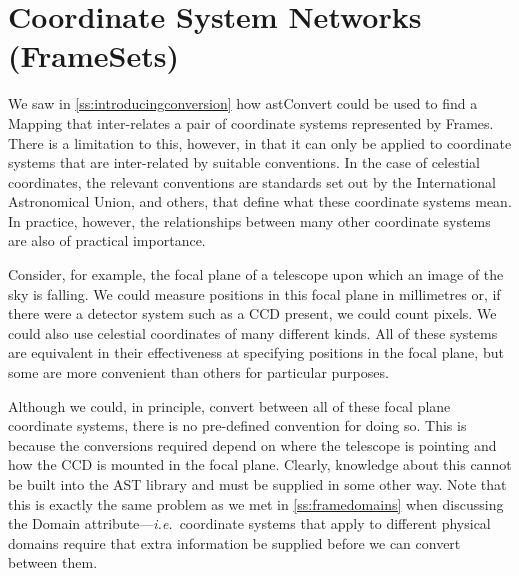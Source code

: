 \documentclass[twoside,11pt]{article}
\newcommand{\htmlref}[2]{#1}
\newcommand{\secref}[1]{\S\ref{#1}}
\renewcommand{\secref}[1]{\ref{#1}}
\begin{document}
%
%

\cleardoublepage
\section{\label{ss:framesets}Coordinate System Networks (FrameSets)}

We saw in \secref{ss:introducingconversion} how \htmlref{astConvert}{astConvert} could be
used to find a \htmlref{Mapping}{Mapping} that inter-relates a pair of coordinate systems
represented by Frames. There is a limitation to this, however, in that
it can only be applied to coordinate systems that are inter-related by
suitable conventions. In the case of celestial coordinates, the
relevant conventions are standards set out by the International
Astronomical Union, and others, that define what these coordinate
systems mean. In practice, however, the relationships between many
other coordinate systems are also of practical importance.

Consider, for example, the focal plane of a telescope upon which an
image of the sky is falling. We could measure positions in this focal
plane in millimetres or, if there were a detector system such as a CCD
present, we could count pixels. We could also use celestial
coordinates of many different kinds. All of these systems are
equivalent in their effectiveness at specifying positions in the focal
plane, but some are more convenient than others for particular
purposes.

Although we could, in principle, convert between all of these focal
plane coordinate systems, there is no pre-defined convention for doing
so. This is because the conversions required depend on where the
telescope is pointing and how the CCD is mounted in the focal
plane. Clearly, knowledge about this cannot be built into the AST
library and must be supplied in some other way. Note that this is
exactly the same problem as we met in \secref{ss:framedomains} when
discussing the \htmlref{Domain}{Domain} attribute---{\em{i.e.}}\ coordinate systems that
apply to different physical domains require that extra information be
supplied before we can convert between them.
\end{document}
